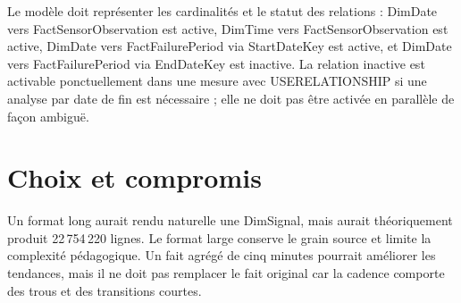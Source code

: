 Le modèle doit représenter les cardinalités et le statut des relations : DimDate vers FactSensorObservation est active, DimTime vers FactSensorObservation est active, DimDate vers FactFailurePeriod via StartDateKey est active, et DimDate vers FactFailurePeriod via EndDateKey est inactive. La relation inactive est activable ponctuellement dans une mesure avec USERELATIONSHIP si une analyse par date de fin est nécessaire ; elle ne doit pas être activée en parallèle de façon ambiguë.

\section{Choix et compromis}
Un format long aurait rendu naturelle une DimSignal, mais aurait théoriquement produit 22\,754\,220 lignes. Le format large conserve le grain source et limite la complexité pédagogique. Un fait agrégé de cinq minutes pourrait améliorer les tendances, mais il ne doit pas remplacer le fait original car la cadence comporte des trous et des transitions courtes.
